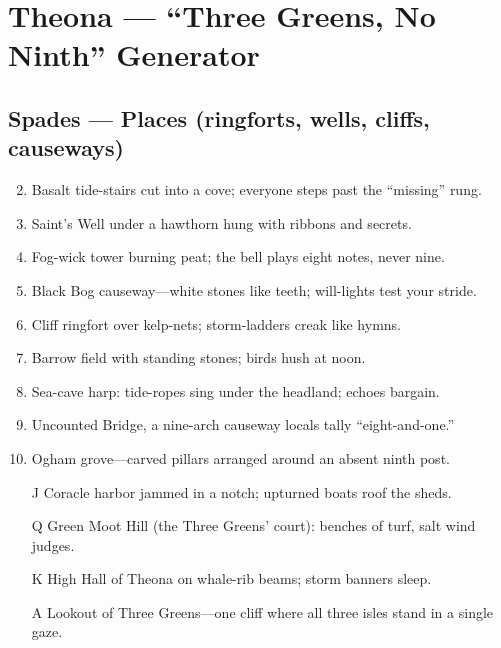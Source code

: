 \chapter{Theona --- ``Three Greens, No Ninth'' Generator}
\label{chap:theona}

\section*{Spades --- Places (ringforts, wells, cliffs, causeways)}
\label{sec:theona-places}
\begin{enumerate}
\setcounter{enumi}{1}
\item Basalt tide-stairs cut into a cove; everyone steps past the ``missing'' rung.
\item Saint's Well under a hawthorn hung with ribbons and secrets.
\item Fog-wick tower burning peat; the bell plays eight notes, never nine.
\item Black Bog causeway---white stones like teeth; will-lights test your stride.
\item Cliff ringfort over kelp-nets; storm-ladders creak like hymns.
\item Barrow field with standing stones; birds hush at noon.
\item Sea-cave harp: tide-ropes sing under the headland; echoes bargain.
\item Uncounted Bridge, a nine-arch causeway locals tally ``eight-and-one.''
\item Ogham grove---carved pillars arranged around an absent ninth post.
\item[J] Coracle harbor jammed in a notch; upturned boats roof the sheds.
\item[Q] Green Moot Hill (the Three Greens' court): benches of turf, salt wind judges.
\item[K] High Hall of Theona on whale-rib beams; storm banners sleep.
\item[A] Lookout of Three Greens---one cliff where all three isles stand in a single gaze.
\end{enumerate}

